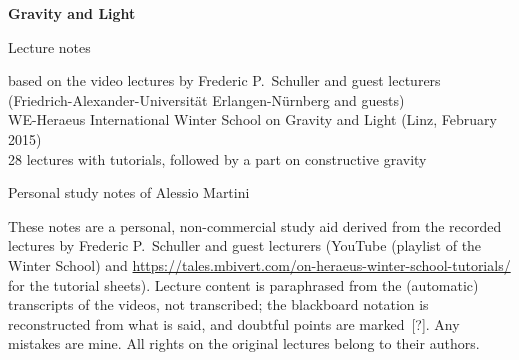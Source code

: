 \documentclass[12pt,oneside,openany]{book}
\begin{document}
\frontmatter
\begin{titlepage}
  \centering
  \vspace*{3cm}
  {\Huge\bfseries Gravity and Light\par}
  \vspace{1cm}
  {\Large Lecture notes\par}
  \vspace{0.5cm}
  {\large based on the video lectures by Frederic P.~Schuller and guest lecturers\\
  (Friedrich-Alexander-Universit\"at Erlangen-N\"urnberg and guests)\\
  WE-Heraeus International Winter School on Gravity and Light (Linz, February 2015)\\28 lectures with tutorials, followed by a part on constructive gravity\par}
  \vspace{2cm}
  {\large Personal study notes of Alessio Martini\par}
  \vfill
  \begin{minipage}{0.85\textwidth}\small
    These notes are a personal, non-commercial study aid derived from the recorded lectures by Frederic P.~Schuller and guest lecturers
    (YouTube (playlist of the Winter School) and \url{https://tales.mbivert.com/on-heraeus-winter-school-tutorials/} for the tutorial sheets).
    Lecture content is paraphrased from the (automatic) transcripts of the videos, not transcribed;
    the blackboard notation is reconstructed from what is said, and doubtful points are marked~[?].
    Any mistakes are mine. All rights on the original lectures belong to their authors.
  \end{minipage}
  \vspace{1cm}
\end{titlepage}
\end{document}
